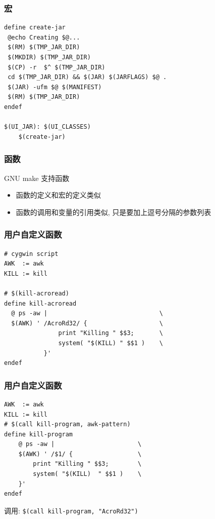 \documentclass[compress]{beamer}
\begin{document}
\begin{frame}[containsverbatim]
\frametitle{宏}

\begin{Verbatim}[showtabs=true]
define create-jar
 @echo Creating $@...
 $(RM) $(TMP_JAR_DIR)
 $(MKDIR) $(TMP_JAR_DIR)
 $(CP) -r  $^ $(TMP_JAR_DIR)
 cd $(TMP_JAR_DIR) && $(JAR) $(JARFLAGS) $@ .
 $(JAR) -ufm $@ $(MANIFEST)
 $(RM) $(TMP_JAR_DIR)
endef

$(UI_JAR): $(UI_CLASSES)
	$(create-jar)
\end{Verbatim}

\end{frame}

\begin{frame}
\frametitle{函数}
GNU make 支持函数\
\begin{itemize}
\item 函数的定义和宏的定义类似
\item 函数的调用和变量的引用类似, 只是要加上逗号分隔的参数列表
\end{itemize}

\end{frame}

\begin{frame}[containsverbatim]
\frametitle{用户自定义函数}


\begin{Verbatim}
# cygwin script
AWK  := awk
KILL := kill

# $(kill-acroread)
define kill-acroread
  @ ps -aw |                               \
  $(AWK) ' /AcroRd32/ {                    \
               print "Killing " $$3;       \
               system( "$(KILL) " $$1 )    \
           }'
endef
\end{Verbatim}

\end{frame}

\begin{frame}[containsverbatim]
\frametitle{用户自定义函数}

\begin{Verbatim}[showtabs=false]
AWK  := awk
KILL := kill
# $(call kill-program, awk-pattern)
define kill-program
	@ ps -aw |                       \
	$(AWK) ' /$1/ {                  \
		print "Killing " $$3;        \
		system( "$(KILL)  " $$1 )    \
	}'
endef
\end{Verbatim}

\noindent 调用: \verb~$(call kill-program, "AcroRd32")~

\end{frame}
\end{document}
